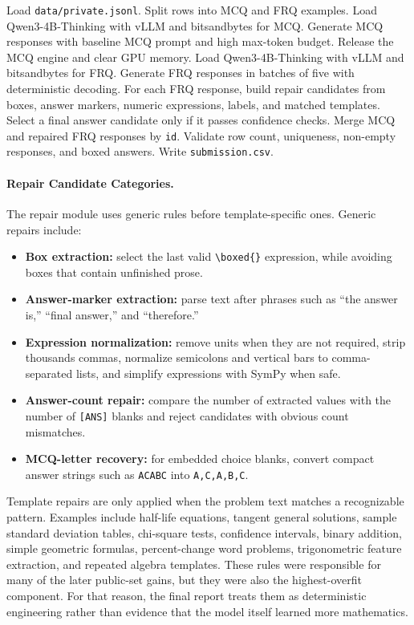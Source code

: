 \documentclass{article}
\begin{document}
\begin{algorithm}[h]
\caption{Final inference pipeline}
\label{alg:run_inference}
\begin{algorithmic}[1]
\STATE Load \texttt{data/private.jsonl}.
\STATE Split rows into MCQ and FRQ examples.
\STATE Load Qwen3-4B-Thinking with vLLM and bitsandbytes for MCQ.
\STATE Generate MCQ responses with baseline MCQ prompt and high max-token budget.
\STATE Release the MCQ engine and clear GPU memory.
\STATE Load Qwen3-4B-Thinking with vLLM and bitsandbytes for FRQ.
\STATE Generate FRQ responses in batches of five with deterministic decoding.
\STATE For each FRQ response, build repair candidates from boxes, answer markers, numeric expressions, labels, and matched templates.
\STATE Select a final answer candidate only if it passes confidence checks.
\STATE Merge MCQ and repaired FRQ responses by \texttt{id}.
\STATE Validate row count, uniqueness, non-empty responses, and boxed answers.
\STATE Write \texttt{submission.csv}.
\end{algorithmic}
\end{algorithm}

\paragraph{Repair Candidate Categories.}
The repair module uses generic rules before template-specific ones. Generic repairs include:
\begin{itemize}
    \item \textbf{Box extraction:} select the last valid \texttt{\textbackslash boxed\{\}} expression, while avoiding boxes that contain unfinished prose.
    \item \textbf{Answer-marker extraction:} parse text after phrases such as ``the answer is,'' ``final answer,'' and ``therefore.''
    \item \textbf{Expression normalization:} remove units when they are not required, strip thousands commas, normalize semicolons and vertical bars to comma-separated lists, and simplify expressions with SymPy when safe.
    \item \textbf{Answer-count repair:} compare the number of extracted values with the number of \texttt{[ANS]} blanks and reject candidates with obvious count mismatches.
    \item \textbf{MCQ-letter recovery:} for embedded choice blanks, convert compact answer strings such as \texttt{ACABC} into \texttt{A,C,A,B,C}.
\end{itemize}
Template repairs are only applied when the problem text matches a recognizable pattern. Examples include half-life equations, tangent general solutions, sample standard deviation tables, chi-square tests, confidence intervals, binary addition, simple geometric formulas, percent-change word problems, trigonometric feature extraction, and repeated algebra templates. These rules were responsible for many of the later public-set gains, but they were also the highest-overfit component. For that reason, the final report treats them as deterministic engineering rather than evidence that the model itself learned more mathematics.
\end{document}
